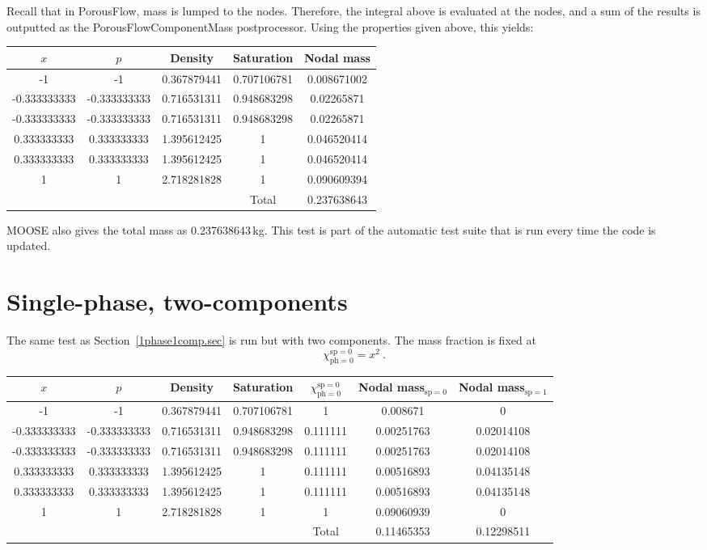 \documentclass[]{scrreprt}
\def\species{\mathrm{sp}}
\def\phase{\mathrm{ph}}
\def\massfrac{\chi}
\begin{document}
Recall that in PorousFlow, mass is lumped to the nodes.  Therefore,
the integral above is evaluated at the nodes, and a sum of the results
is outputted as the PorousFlowComponentMass postprocessor.
Using the properties given above, this yields:
\begin{center}
\begin{tabular}{|ccccc|}
\hline
$x$ & $p$ & Density & Saturation & Nodal mass \\
\hline
-1 & -1 & 0.367879441 & 0.707106781 & 0.008671002 \\
-0.333333333 & -0.333333333 & 0.716531311 & 0.948683298 & 0.02265871 \\
-0.333333333 & -0.333333333 & 0.716531311 & 0.948683298 & 0.02265871 \\
0.333333333 & 0.333333333 & 1.395612425 & 1 & 0.046520414 \\
0.333333333 & 0.333333333 & 1.395612425 & 1 & 0.046520414 \\
1& 1 & 2.718281828 & 1 & 0.090609394 \\
\hline
 & & & Total & 0.237638643 \\
\hline
\end{tabular}
\end{center}
MOOSE also gives the total mass as 0.237638643\,kg.  This test is part of
the automatic test suite that is run every time the code is updated.

\newpage

\section{Single-phase, two-components}

The same test as Section~\ref{1phase1comp.sec} is run but with two
components.  The mass fraction is fixed at
\begin{equation}
\massfrac_{\phase=0}^{\species=0} = x^{2} \ .
\end{equation}

\begin{center}
\begin{tabular}{|ccccccc|}
\hline
$x$ & $p$ & Density & Saturation & $\massfrac_{\phase=0}^{\species=0}$
& Nodal mass$_{\species=0}$ & Nodal mass$_{\species=1}$ \\
\hline
-1 & -1 & 0.367879441 & 0.707106781 & 1 & 0.008671 & 0 \\
-0.333333333 & -0.333333333 & 0.716531311 & 0.948683298 & 0.111111 &
0.00251763 & 0.02014108 \\
-0.333333333 & -0.333333333 & 0.716531311 & 0.948683298 & 0.111111 &
0.00251763 & 0.02014108 \\
0.333333333 & 0.333333333 & 1.395612425 & 1 & 0.111111 & 0.00516893 &
0.04135148 \\
0.333333333 & 0.333333333 & 1.395612425 & 1 & 0.111111 & 0.00516893 &
0.04135148 \\
1& 1 & 2.718281828 & 1 & 1 & 0.09060939 & 0 \\
\hline
 & & & & Total & 0.11465353 & 0.12298511 \\
\hline
\end{tabular}
\end{center}
\end{document}
